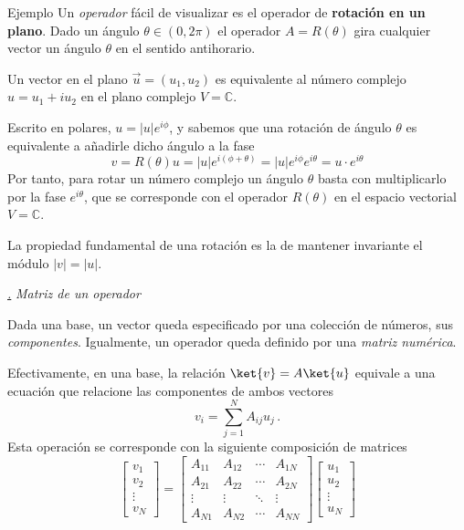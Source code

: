\documentclass[a4paper,11pt]{book} %
\numberwithin{equation}{chapter}
\def\subsubiContadorIt{\par\addtocounter{subsubsection}{1}\underline{\it\thesubsubsection.}\hskip0.5cm \setcounter{subsubsubsectionIt}{0}}
\newcommand{\SubsubiIt}[1]{
		\subsubiContadorIt \textit{#1}
	}
\newcounter{subsubsubsectionIt}[subsubsection]
\begin{document}
	\begin{mybox_green}{Ejemplo}
	Un \textit{operador}  fácil de visualizar es el operador de \textbf{rotación en un plano}. Dado un ángulo $\theta \in (0,2\pi)$ el operador $A = R(\theta)$ gira cualquier vector un ángulo $\theta$ en el sentido antihorario.
\vspace{0.3cm}

Un vector en el plano ${\vec{u}} =  (u_1,u_2)$  es equivalente al número complejo $u = u_1 + i u_2$ en el plano complejo $V = {\mathbb C}$.
\vspace{0.3cm}

Escrito en polares, $u=|u|e^{i\phi}$, y sabemos que una rotación de ángulo $\theta$ es equivalente a añadirle dicho  ángulo a la fase 
$$
 v = R(\theta) u = |u| e^{i(\phi + \theta)} =  |u| e^{i\phi } e^{i\theta} = u\cdot e^{i\theta} 
$$
Por tanto, para rotar un número complejo un ángulo $\theta$ basta con multiplicarlo por la fase $e^{i\theta}$, que se corresponde con el operador $R(\theta)$ en el espacio vectorial $V = \mathbb{C}$.       
\vspace{0.3cm}
    
La propiedad fundamental de una rotación es la de mantener invariante el módulo  $|v| = |u|$.    
	\end{mybox_green}


			\SubsubiIt{Matriz de un operador}

Dada una base, un vector queda especificado por una colección de números, sus \textit{componentes}. Igualmente, un operador queda definido por una \textit{matriz numérica}.


Efectivamente, en una base, la relación $\ket{v} = A\ket{u}$ equivale a una ecuación que relacione las componentes de ambos vectores
	\begin{equation}
	\boxed{v_i = \sum_{j=1}^N A_{ij} u_j } \, .
	\end{equation}
Esta operación se corresponde con la siguiente composición de matrices
	\begin{equation}
	\boxed{\begin{bmatrix}
v_1 \\ v_2 \\ \vdots \\ v_N \end{bmatrix} =  \begin{bmatrix} 
A_{11} & A_{12} & \cdots & A_{1N} \\
A_{21} & A_{22} & \cdots & A_{2N} \\
\vdots & \vdots &  \ddots      & \vdots \\
A_{N1} & A_{N2} &    \cdots    & A_{NN}
\end{bmatrix}
 \begin{bmatrix} 
u_1 \\ u_2 \\ \vdots \\ u_N\end{bmatrix}}
	\end{equation}
\end{document}
